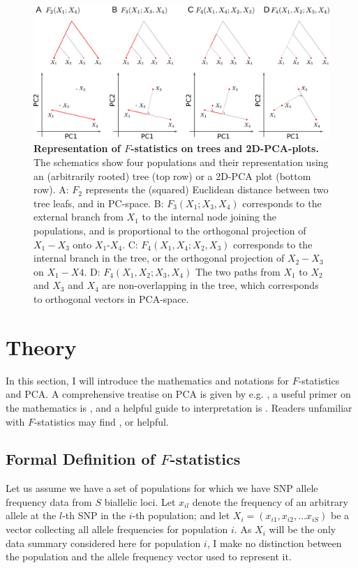 \documentclass[12pt,fullpage, a4paper]{article}
\begin{document}
\begin{figure}[!ht]
	\includegraphics[width=\textwidth]{figures/fstats_pca_vs_tree.pdf}
	\caption{\textbf{Representation of $F$-statistics on trees and 2D-PCA-plots.} The schematics show four populations and their representation using an (arbitrarily rooted) tree (top row) or a 2D-PCA plot (bottom row). A: $F_2$ represents the (squared) Euclidean distance between two tree leafs, and in PC-space. B: $F_3(X_1; X_3, X_4)$ corresponds to the external branch from $X_1$ to the internal node joining the populations, and is proportional to the orthogonal projection of $X_1 - X_3$ onto $X_1$-$X_4$. C: $F_4(X_1, X_4; X_2, X_3)$ corresponds to the internal branch in the tree, or the orthogonal projection of $X_2 - X_3$ on $X_1 - X4$. D: $F_4(X_1, X_2; X_3, X_4)$ The two paths from $X_1$ to $X_2$ and $X_3$ and $X_4$ are non-overlapping in the tree, which corresponds to orthogonal vectors in PCA-space.}
	\label{fig:geom}
\end{figure}	
	
\section{Theory}
In this section, I will introduce the mathematics and notations for $F$-statistics and PCA. A comprehensive  treatise on PCA is given by e.g. \cite{jolliffe2013}, a useful primer on the mathematics is \cite{pachter2014}, and a helpful guide to interpretation is \cite{cavalli-sforza1994}. Readers unfamiliar with $F$-statistics may find \cite{patterson2012}, \cite{peter2016} or \cite{oteo-garcia2021} helpful.

\subsection{Formal Definition of $F$-statistics}
Let us assume we have a set of populations for which we have SNP allele frequency data from $S$ biallelic loci. Let $x_{il}$ denote the frequency of an arbitrary allele at the $l$-th SNP in the $i$-th population; and let $X_i = (x_{i1}, x_{i2}, \dots x_{iS})$  be a vector collecting all allele frequencies for population $i$. As $X_i$ will be the only data summary considered here for population $i$, I make no distinction between the population and the allele frequency vector used to represent it.
\end{document}
